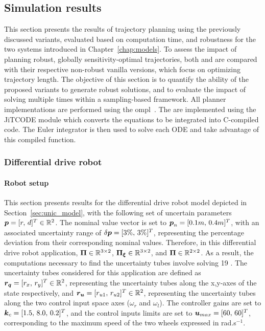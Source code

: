 \subsection{Simulation results}\label{sec:samp_simu}

This section presents the results of trajectory planning using the previously discussed variants, evaluated based on computation time, and robustness for the two systems introduced in Chapter~\ref{chap:models}.
To assess the impact of planning robust, globally sensitivity-optimal trajectories, both  and  are compared with their respective non-robust vanilla versions, which focus on optimizing trajectory length.
The objective of this section is to quantify the ability of the proposed variants to generate robust solutions, and to evaluate the impact of solving  multiple times within a sampling-based framework.
All planner implementations are performed using the \gls{ompl}~\cite{cOMPL}.
The  are implemented using the JiTCODE \cite{cJit} module which converts the equations to be integrated into C-compiled code.
The Euler integrator is then used to solve each ODE and take advantage of this compiled function.

\subsubsection{Differential drive robot}

\paragraph{Robot setup}

This section presents results for the differential drive robot model depicted in Section~\ref{sec:unic_model}, with the following set of uncertain parameters $\boldsymbol{p} = [r, \, d]^T \in \mathbb{R}^{2}$.
The nominal value vector is set to $\boldsymbol{p}_n = [0.1m, \, 0.4m]^T$, with an associated uncertainty range of $\delta\boldsymbol{p} = [3\%, \, 3\%]^T$, representing the percentage deviation from their corresponding nominal values.
Therefore, in this differential drive robot application, $\boldsymbol{\Pi} \in \mathbb{R}^{3\times2}$, $\boldsymbol{\Pi_{\xi}}\in \mathbb{R}^{3\times2}$, and $\boldsymbol{\Pi} \in \mathbb{R}^{2\times2}$.
As a result, the computations necessary to find the uncertainty tubes involve solving 19 .
The uncertainty tubes considered for this application are defined as $\boldsymbol{r_q} = [r_x, \, r_y]^T \in \mathbb{R}^2$, representing the uncertainty tubes along the x,y-axes of the state respectively, and $\boldsymbol{r_u} = [r_{u1}, \, r_{u2}]^T \in \mathbb{R}^2$, representing the uncertainty tubes along the two control input space axes ($\omega_r$ and $\omega_l$).
The controller gains are set to $\boldsymbol{k}_c = [1.5, \, 8.0, \, 0.2]^T$, and the control inputs limits are set to $\boldsymbol{u}_{max} = [60, \, 60]^T$, corresponding to the maximum speed of the two wheels expressed in rad.s$^{-1}$.

